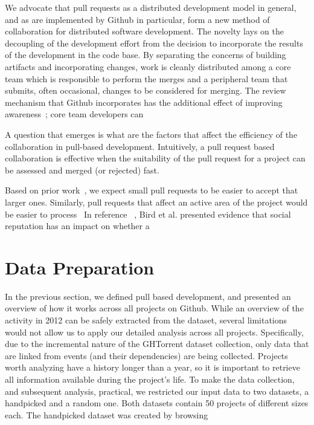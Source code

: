 \documentclass{sig-alternate}
\begin{document}
We advocate that pull requests as a distributed development model in general,
and as are implemented by Github in particular, form a new method of
collaboration for distributed software development. The novelty lays on
the decoupling of the development effort from the decision to incorporate
the results of the development in the code base. 
By separating the concerns of building artifacts and incorporating
changes, work is cleanly distributed among a core team which is responsible
to perform the merges and a peripheral team that submits, often occasional,
changes to be considered for merging. 
The review mechanism that Github incorporates has the additional effect of
improving awareness~\cite{Dabbi12}; core team developers can 

A question that emerges is what are the factors that affect the efficiency
of the collaboration in pull-based development. Intuitively, a pull request
based collaboration is effective when the suitability of the pull request for
a project can be assessed and merged (or rejected) fast. 

Based on prior work~\cite{Weiss08}, we expect small pull requests to be easier to accept that larger ones. Similarly, pull requests that affect an active
area of the project would be easier to process~
In reference ~\cite{Bird07}, Bird et al. presented evidence that social
reputation has an impact on whether a

\section{Data Preparation}

In the previous section, we defined pull based development, and presented an
overview of how it works across all projects on Github. While an overview of the
activity in 2012 can be safely extracted from the dataset, several limitations
would not allow us to apply our detailed analysis across all projects.
Specifically, due to the incremental nature of the GHTorrent dataset collection,
only data that are linked from events (and their dependencies) are being
collected. Projects worth analyzing have a history longer than a year, so it is
important to retrieve all information available during the project's life. To
make the data collection, and subsequent analysis, practical, we restricted our
input data to two datasets, a \textsf{handpicked} and a \textsf{random} one. 
Both datasets contain 50 projects of different sizes each. The 
\textsf{handpicked} dataset was created by browsing 
\end{document}
